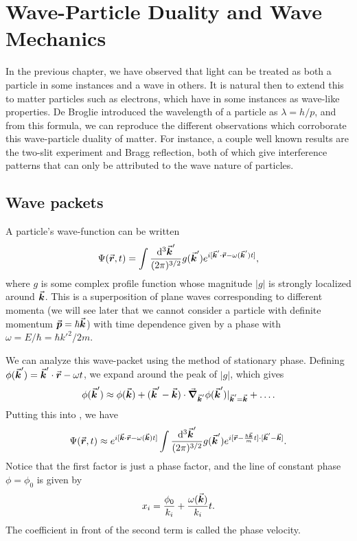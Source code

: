 \chapter{Wave-Particle Duality and Wave Mechanics}

In the previous chapter, we have observed that light can be treated as both a particle in some instances and a wave in others.
It is natural then to extend this to matter particles such as electrons, which have in some instances as wave-like properties.
De Broglie introduced the wavelength of a particle as $\lambda = h/p$, and from this formula, we can reproduce the different observations which corroborate this wave-particle duality of matter.
For instance, a couple well known results are the two-slit experiment and Bragg reflection, both of which give interference patterns that can only be attributed to the wave nature of particles.

\section{Wave packets}

A particle's wave-function can be written
\begin{eqnarray}
    \label{eq:wave-packet}
    \Psi(\va*{r},t) = \int \frac{\dd[3]{\va*{k}'}}{(2 \pi)^{3/2}} g(\va*{k}') e^{i [ \va*{k}' \cdot \va*{r} - \omega(\va*{k}') t ]}
,\end{eqnarray}
where $g$ is some complex profile function whose magnitude $|g|$ is strongly localized around $\va*{k}$.
This is a superposition of plane waves corresponding to different momenta (we will see later that we cannot consider a particle with definite momentum $\va*{p} = \hbar \va*{k}$) with time dependence given by a phase with $\omega = E/\hbar = \hbar k'^2/2m$.

We can analyze this wave-packet using the method of stationary phase.
Defining $\phi(\va*{k}') = \va*{k}' \cdot \va*{r} - \omega t$, we expand around the peak of $|g|$, which gives
\begin{eqnarray}
    \phi(\va*{k}') \approx \phi(\va*{k}) + (\va*{k}' - \va*{k}) \cdot \grad_{\va*{k}'} \phi(\va*{k}')|_{\va*{k}' = \va*{k}} + \ldots
.\end{eqnarray}
Putting this into , we have
\begin{eqnarray}
    \Psi(\va*{r},t) \approx e^{i [\va*{k} \cdot \va*{r} - \omega(\va*{k}) t]} \int \frac{\dd[3]{\va*{k}'}}{(2 \pi)^{3/2}} g(\va*{k}') e^{i [ \va*{r} - \frac{\hbar \va*{k}}{m} t ] \cdot [\va*{k}' - \va*{k}]}
.\end{eqnarray}
Notice that the first factor is just a phase factor, and the line of constant phase $\phi = \phi_0$ is given by
\begin{eqnarray}
    x_{i} = \frac{\phi_0}{k_{i}} + \frac{\omega(\va*{k})}{k_{i}} t
.\end{eqnarray}
The coefficient in front of the second term is called the phase velocity.


